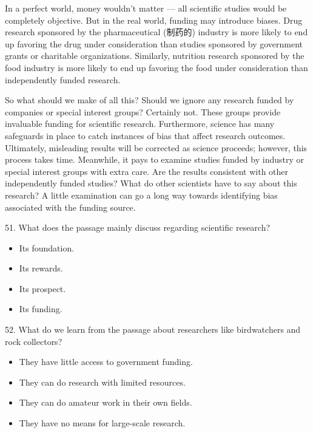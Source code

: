 \documentclass[UTF8,11pt]{ctexart}
\begin{document}
In a perfect world, money wouldn’t matter — all scientific studies would be completely objective. But in the real world, funding may introduce biases. Drug research sponsored by the pharmaceutical (制药的) industry is more likely to end up favoring the drug under consideration than studies sponsored by government grants or charitable organizations. Similarly, nutrition research sponsored by the food industry is more likely to end up favoring the food under consideration than independently funded research.


So what should we make of all this? Should we ignore any research funded by companies or special interest groups? Certainly not. These groups provide invaluable funding for scientific research. Furthermore, science has many safeguards in place to catch instances of bias that affect research outcomes. Ultimately, misleading results will be corrected as science proceeds; however, this process takes time. Meanwhile, it pays to examine studies funded by industry or special interest groups with extra care. Are the results consistent with other independently funded studies? What do other scientists have to say about this research? A little examination can go a long way towards identifying bias associated with the funding source.


51. What does the passage mainly discuss regarding scientific research?


\begin{itemize}[leftmargin=2em,itemsep=.2em,topsep=.4em]\item[A.] Its foundation.
\item[B.] Its rewards.
\item[C.] Its prospect.
\item[D.] Its funding.
\end{itemize}

52. What do we learn from the passage about researchers like birdwatchers and rock collectors?


\begin{itemize}[leftmargin=2em,itemsep=.2em,topsep=.4em]\item[A.] They have little access to government funding.
\item[B.] They can do research with limited resources.
\item[C.] They can do amateur work in their own fields.
\item[D.] They have no means for large-scale research.
\end{itemize}
\end{document}
